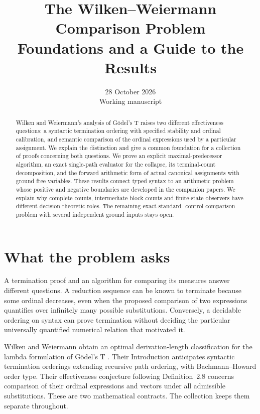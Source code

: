 \documentclass[11pt,a4paper]{article}
\title{The Wilken--Weiermann Comparison Problem\\
Foundations and a Guide to the Results}
\author{}
\date{28 October 2026\\Working manuscript}
\begin{document}
\maketitle
\begin{abstract}
Wilken and Weiermann's analysis of G\"odel's T raises two different
effectiveness questions: a syntactic termination ordering with specified
stability and ordinal calibration, and semantic comparison of the ordinal
expressions used by a particular assignment.  We explain the distinction
and give a common foundation for a collection of proofs concerning both
questions.  We prove an explicit maximal-predecessor algorithm, an exact
single-path evaluator for the collapse, its terminal-count decomposition,
and the forward arithmetic form of actual canonical assignments with ground
free variables.  These results connect typed syntax to an arithmetic problem
whose positive and negative boundaries are developed in the companion papers.
We explain why complete counts, intermediate block counts and finite-state
observers have different decision-theoretic roles.  The remaining exact-standard-
control comparison problem with several independent ground inputs stays open.
\end{abstract}

\tableofcontents

\section{What the problem asks}\label{sec:problem}

A termination proof and an algorithm for comparing its measures answer
different questions.  A reduction sequence can be known to terminate because
some ordinal decreases, even when the proposed comparison of two expressions
quantifies over infinitely many possible substitutions.  Conversely, a
decidable ordering on syntax can prove termination without deciding the
particular universally quantified numerical relation that motivated it.

Wilken and Weiermann obtain an optimal derivation-length classification for
the lambda formulation of G\"odel's T \cite{ww}.  Their Introduction
anticipates syntactic termination orderings extending recursive path ordering,
with Bachmann--Howard order type.  Their effectiveness conjecture following
Definition~2.8 concerns comparison of their ordinal expressions and vectors
under all admissible substitutions.  These are two mathematical contracts.
The collection keeps them separate throughout.
\end{document}

